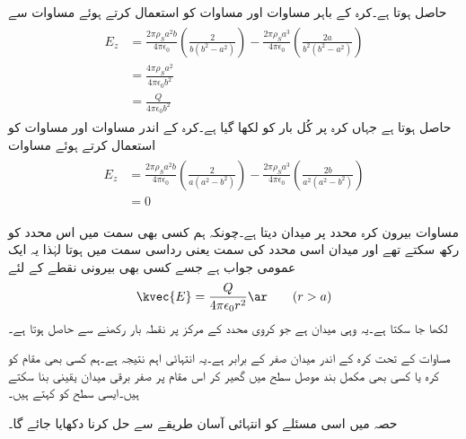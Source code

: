 حاصل ہوتا ہے۔کرہ کے باہر مساوات  اور مساوات   کو استعمال کرتے ہوئے مساوات  سے
\begin{gather}
\begin{aligned}\label{مساوات_کولمب_کرہ_بار_کا_میدان_ب}
E_z&=\frac{2 \pi\rho_S a^2 b}{4 \pi \epsilon_0} \left(\frac{2}{b(b^2-a^2)}\right)-\frac{2 \pi\rho_S a^3}{4 \pi \epsilon_0} \left(\frac{2a}{b^2(b^2-a^2)}\right)\\
&=\frac{4 \pi \rho_S a^2}{4\pi \epsilon_0 b^2}\\
&=\frac{Q}{4\pi \epsilon_0 b^2}
\end{aligned}
\end{gather}
حاصل ہوتا ہے جہاں  کرہ پر کُل بار  کو  لکھا گیا ہے۔کرہ کے اندر مساوات  اور مساوات   کو استعمال کرتے ہوئے مساوات 
\begin{gather}
\begin{aligned}\label{مساوات_کولمب_کرہ_بار_کا_میدان_پ}
E_z&=\frac{2 \pi\rho_S a^2 b}{4 \pi \epsilon_0} \left(\frac{2}{a(a^2-b^2)}\right)-\frac{2 \pi\rho_S a^3}{4 \pi \epsilon_0} \left(\frac{2b}{a^2(a^2-b^2)}\right)\\
&=0
\end{aligned}
\end{gather}

مساوات  بیرون کرہ  محدد پر میدان دیتا ہے۔چونکہ ہم کسی بھی سمت میں اس محدد کو رکھ سکتے تھے اور میدان اسی محدد کی سمت یعنی رداسی سمت میں ہوتا  لہٰذا یہ ایک عمومی جواب ہے جسے کسی بھی بیرونی نقطے کے لئے
\begin{align}
\kvec{E}=\frac{Q}{4\pi \epsilon_0 r^2} \ar  \quad \quad (r>a)
\end{align}
لکھا جا سکتا ہے۔یہ وہی میدان ہے جو کروی محدد کے مرکز پر  نقطہ بار رکھنے سے حاصل ہوتا ہے۔

مساوات  کے تحت کرہ کے اندر میدان صفر کے برابر ہے۔یہ انتہائی اہم نتیجہ ہے۔ہم کسی بھی مقام کو کرہ یا کسی بھی مکمل بند موصل سطح میں گھیر کر اس مقام پر صفر برقی میدان یقینی بنا سکتے ہیں۔ایسی سطح کو  کہتے ہیں۔

حصہ  میں اسی مسئلے کو انتہائی آسان طریقے سے حل کرنا دکھایا جائے گا۔

